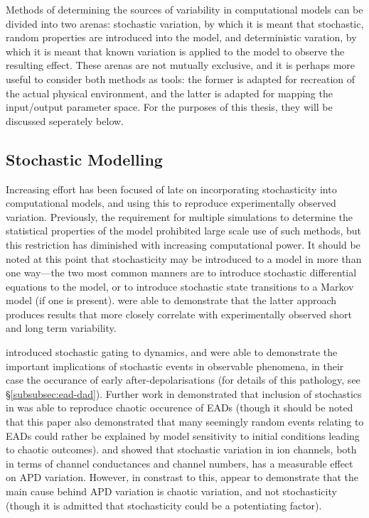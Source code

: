 \documentclass[../thesis-main.tex]{subfiles}
\begin{document}
Methods of determining the sources of variability in computational models can be divided into two arenas: stochastic variation, by which it is meant that stochastic, random properties are introduced into the model, and deterministic varation, by which it is meant that known variation is applied to the model to observe the resulting effect. These arenas are not mutually exclusive, and it is perhaps more useful to consider both methods as tools: the former is adapted for recreation of the actual physical environment, and the latter is adapted for mapping the input/output parameter space. For the purposes of this thesis, they will be discussed seperately below.

\subsection{Stochastic Modelling}
\label{subsec:stochastic-modelling}
Increasing effort has been focused of late on incorporating stochasticity into computational models, and using this to reproduce experimentally observed variation. Previously, the requirement for multiple simulations to determine the statistical properties of the model prohibited large scale use of such methods, but this restriction has diminished with increasing computational power. It should be noted at this point that stochasticity may be introduced to a model in more than one way---the two most common manners are to introduce stochastic differential equations to the model, or to introduce stochastic state transitions to a Markov model (if one is present). \citet{Heijman2013} were able to demonstrate that the latter approach produces results that more closely correlate with experimentally observed short and long term variability.

\citet{Tanskanen2005} introduced stochastic gating to \ca{} dynamics, and were able to demonstrate the important implications of stochastic events in observable phenomena, in their case the occurance of early after-depolarisations (for details of this pathology, see \S\ref{subsubsec:ead-dad}). Further work in \citet{Sato2009} demonstrated that inclusion of stochastics in \iks{} was able to reproduce chaotic occurence of EADs (though it should be noted that this paper also demonstrated that many seemingly random events relating to EADs could rather be explained by model sensitivity to initial conditions leading to chaotic outcomes). \citet{Pueyo2011} and \citet{Lemay2011} showed that stochastic variation in ion channels, both in terms of channel conductances and channel numbers, has a measurable effect on APD variation. However, in constrast to this, \citet{Sato2010} appear to demonstrate that the main cause behind APD variation is chaotic variation, and not stochasticity (though it is admitted that stochasticity could be a potentiating factor).
\end{document}
